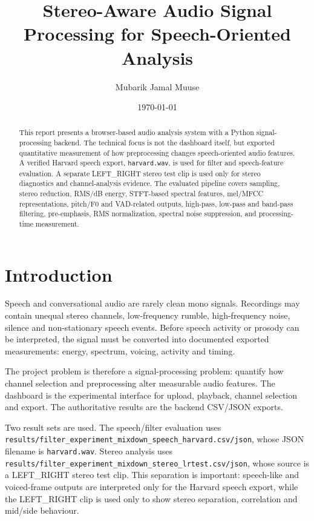 \documentclass[11pt,a4paper]{article}
\title{Stereo-Aware Audio Signal Processing for Speech-Oriented Analysis}
\author{Mubarik Jamal Muuse}
\date{\today}
\begin{document}
\maketitle

\begin{abstract}
This report presents a browser-based audio analysis system with a Python signal-processing backend. The technical focus is not the dashboard itself, but exported quantitative measurement of how preprocessing changes speech-oriented audio features. A verified Harvard speech export, \texttt{harvard.wav}, is used for filter and speech-feature evaluation. A separate LEFT\_RIGHT stereo test clip is used only for stereo diagnostics and channel-analysis evidence. The evaluated pipeline covers sampling, stereo reduction, RMS/dB energy, STFT-based spectral features, mel/MFCC representations, pitch/F0 and VAD-related outputs, high-pass, low-pass and band-pass filtering, pre-emphasis, RMS normalization, spectral noise suppression, and processing-time measurement.
\end{abstract}

\section{Introduction}

Speech and conversational audio are rarely clean mono signals. Recordings may contain unequal stereo channels, low-frequency rumble, high-frequency noise, silence and non-stationary speech events. Before speech activity or prosody can be interpreted, the signal must be converted into documented exported measurements: energy, spectrum, voicing, activity and timing.

The project problem is therefore a signal-processing problem: quantify how channel selection and preprocessing alter measurable audio features. The dashboard is the experimental interface for upload, playback, channel selection and export. The authoritative results are the backend CSV/JSON exports.

Two result sets are used. The speech/filter evaluation uses \texttt{results/filter\_experiment\_mixdown\_speech\_harvard.csv/json}, whose JSON filename is \texttt{harvard.wav}. Stereo analysis uses \texttt{results/filter\_experiment\_mixdown\_stereo\_lrtest.csv/json}, whose source is a LEFT\_RIGHT stereo test clip. This separation is important: speech-like and voiced-frame outputs are interpreted only for the Harvard speech export, while the LEFT\_RIGHT clip is used only to show stereo separation, correlation and mid/side behaviour.
\end{document}
